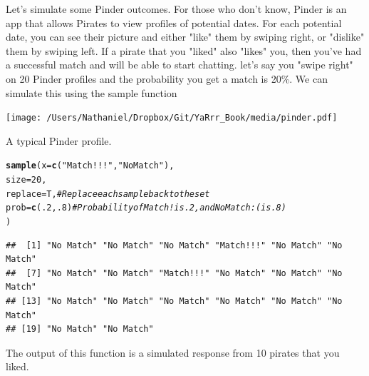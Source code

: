 \documentclass{tufte-book}\usepackage[]{graphicx}\usepackage[]{color}
\makeatletter
\newcommand{\hlnum}[1]{\textcolor[rgb]{0.686,0.059,0.569}{#1}}%
\newcommand{\hlstr}[1]{\textcolor[rgb]{0.192,0.494,0.8}{#1}}%
\newcommand{\hlcom}[1]{\textcolor[rgb]{0.678,0.584,0.686}{\textit{#1}}}%
\newcommand{\hlstd}[1]{\textcolor[rgb]{0.345,0.345,0.345}{#1}}%
\newcommand{\hlkwc}[1]{\textcolor[rgb]{0.333,0.667,0.333}{#1}}%
\newcommand{\hlkwd}[1]{\textcolor[rgb]{0.737,0.353,0.396}{\textbf{#1}}}%
\newenvironment{kframe}{%
 \def\at@end@of@kframe{}%
 \ifinner\ifhmode%
  \def\at@end@of@kframe{\end{minipage}}%
  \begin{minipage}{\columnwidth}%
 \fi\fi%
 \def\FrameCommand##1{\hskip\@totalleftmargin \hskip-\fboxsep
 \colorbox{shadecolor}{##1}\hskip-\fboxsep
     \hskip-\linewidth \hskip-\@totalleftmargin \hskip\columnwidth}%
 \MakeFramed {\advance\hsize-\width
   \@totalleftmargin\z@ \linewidth\hsize
   \@setminipage}}%
 {\par\unskip\endMakeFramed%
 \at@end@of@kframe}
\newenvironment{knitrout}{}{} %
\makeatother
\begin{document}
Let's simulate some Pinder outcomes. For those who don't know, Pinder is an app that allows Pirates to view profiles of potential dates. For each potential date, you can see their picture and either "like" them by swiping right, or "dislike" them by swiping left. If a pirate that you "liked" also "likes" you, then you've had a successful match and will be able to start chatting. let's say you "swipe right" on 20 Pinder profiles and the probability you get a match is 20\%. We can simulate this using the sample function

\begin{marginfigure}
\texttt{[image: /Users/Nathaniel/Dropbox/Git/YaRrr\_Book/media/pinder.pdf]}
\caption{A typical Pinder profile.}
\label{fig:pinder}
\end{marginfigure}

\begin{footnotesize}
\begin{knitrout}
\color{fgcolor}\begin{kframe}
\begin{alltt}
\hlkwd{sample}\hlstd{(}\hlkwc{x} \hlstd{=} \hlkwd{c}\hlstd{(}\hlstr{"Match!!!"}\hlstd{,} \hlstr{"No Match"}\hlstd{),}
       \hlkwc{size} \hlstd{=} \hlnum{20}\hlstd{,}
       \hlkwc{replace} \hlstd{= T,} \hlcom{# Replace each sample back to the set}
       \hlkwc{prob} \hlstd{=} \hlkwd{c}\hlstd{(}\hlnum{.2}\hlstd{,} \hlnum{.8}\hlstd{)}  \hlcom{# Probability of Match! is .2, and No Match :( is .8)}
       \hlstd{)}
\end{alltt}
\begin{verbatim}
##  [1] "No Match" "No Match" "No Match" "Match!!!" "No Match" "No Match"
##  [7] "No Match" "No Match" "Match!!!" "No Match" "No Match" "No Match"
## [13] "No Match" "No Match" "No Match" "No Match" "No Match" "No Match"
## [19] "No Match" "No Match"
\end{verbatim}
\end{kframe}
\end{knitrout}
\end{footnotesize}

The output of this function is a simulated response from 10 pirates that you liked.

\end{document}
